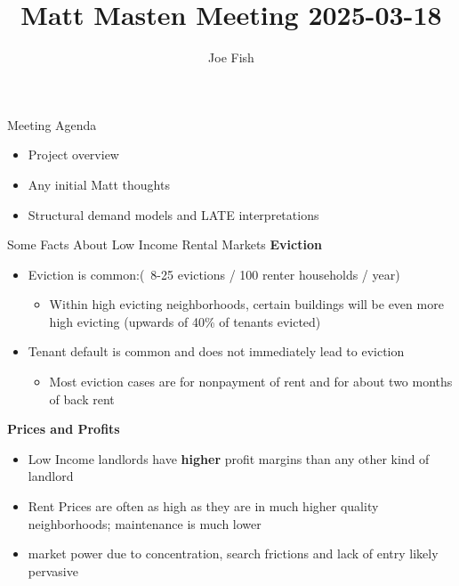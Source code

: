 \documentclass[10pt, xcolor=dvipsnames]{beamer}
\date{}
\title[Landlord Responses to Changes in Tenant Protections]{Matt Masten Meeting 2025-03-18} %
\author[Joe Fish]{Joe Fish}
\begin{document}
\begin{frame}
\titlepage %
\end{frame}

\begin{frame}{Meeting Agenda}
    \begin{itemize}
        \item Project overview
        \item Any initial Matt thoughts
        \item Structural demand models and LATE interpretations
    \end{itemize}
    
\end{frame}

\begin{frame}{Some Facts About Low Income Rental Markets}
\textbf{Eviction}
    \begin{itemize}
        \item Eviction is common:(~8-25 evictions / 100 renter households / year)
        \begin{itemize}
            \item Within high evicting neighborhoods, certain buildings will be even more high evicting (upwards of 40\% of tenants evicted)
        \end{itemize}
        \item Tenant default is common and does not immediately lead to eviction
        \begin{itemize}
            \item Most eviction cases are for nonpayment of rent and for about two months of back rent
        \end{itemize}
    \end{itemize}
\textbf{Prices and Profits}
\begin{itemize}
        \item Low Income landlords have \textbf{higher} profit margins than any other kind of landlord
        \item Rent Prices are often as high as they are in much higher quality neighborhoods; maintenance is much lower 
        \item market power due to concentration, search frictions and lack of entry likely pervasive
\end{itemize}
    
\end{frame}
\end{document}
